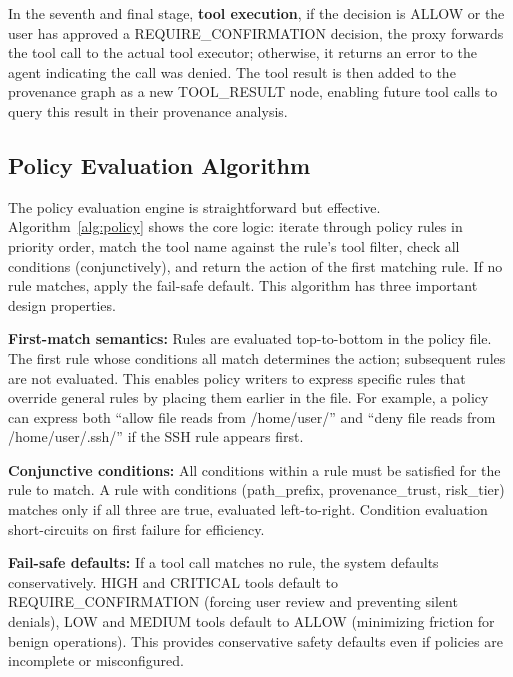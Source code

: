 In the seventh and final stage, \textbf{tool execution}, if the decision is ALLOW or the user has approved a REQUIRE\_CONFIRMATION decision, the proxy forwards the tool call to the actual tool executor; otherwise, it returns an error to the agent indicating the call was denied. The tool result is then added to the provenance graph as a new TOOL\_RESULT node, enabling future tool calls to query this result in their provenance analysis.

\subsection{Policy Evaluation Algorithm}

The policy evaluation engine is straightforward but effective. Algorithm~\ref{alg:policy} shows the core logic: iterate through policy rules in priority order, match the tool name against the rule's tool filter, check all conditions (conjunctively), and return the action of the first matching rule. If no rule matches, apply the fail-safe default. This algorithm has three important design properties.

\textbf{First-match semantics:} Rules are evaluated top-to-bottom in the policy file. The first rule whose conditions all match determines the action; subsequent rules are not evaluated. This enables policy writers to express specific rules that override general rules by placing them earlier in the file. For example, a policy can express both ``allow file reads from /home/user/'' and ``deny file reads from /home/user/.ssh/'' if the SSH rule appears first.

\textbf{Conjunctive conditions:} All conditions within a rule must be satisfied for the rule to match. A rule with conditions (path\_prefix, provenance\_trust, risk\_tier) matches only if all three are true, evaluated left-to-right. Condition evaluation short-circuits on first failure for efficiency.

\textbf{Fail-safe defaults:} If a tool call matches no rule, the system defaults conservatively. HIGH and CRITICAL tools default to REQUIRE\_CONFIRMATION (forcing user review and preventing silent denials), LOW and MEDIUM tools default to ALLOW (minimizing friction for benign operations). This provides conservative safety defaults even if policies are incomplete or misconfigured.

